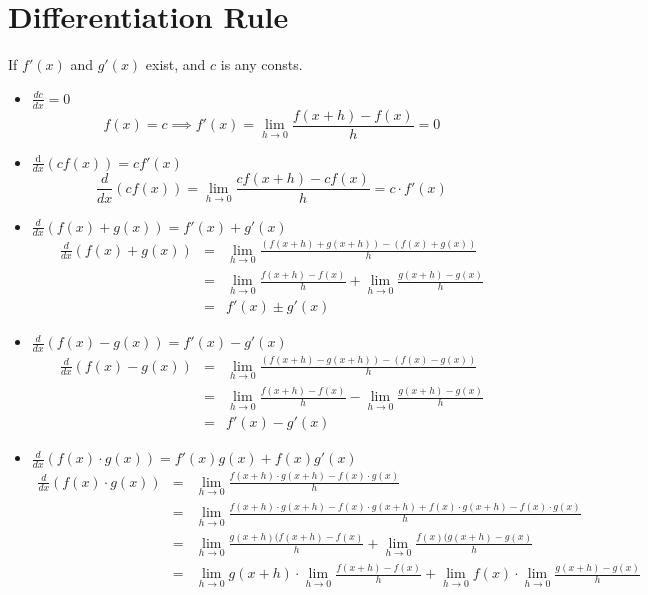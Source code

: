 \section{Differentiation Rule}
If $f'(x)$ and $g'(x)$ exist, and $c$ is any consts.
\begin{itemize}
\item $\displaystyle \frac{dc}{dx} = 0$
$$f(x) = c \displaystyle \implies f'(x) = \lim_{h \to 0} \frac{f(x+h) - f(x)}{h} = 0$$
\item $\displaystyle \frac{\mathrm{d}}{dx} (c f(x)) = c f'(x)$
$$\displaystyle \frac{d}{dx} (cf(x)) = \lim_{h \to 0} \frac{cf(x+h) - cf(x)}{h} = c \cdot f'(x)$$
\item $\displaystyle \frac{d}{dx} (f(x) + g(x)) = f'(x) + g'(x)$
$$\begin{array}{rcl}
\displaystyle \frac{d}{dx} (f(x) + g(x)) & = & \displaystyle \lim_{h \to 0} \frac{(f(x + h) + g(x+h)) - (f(x) + g(x))}{h}\\
& = & \displaystyle \lim_{h \to 0} \frac{f(x+h) - f(x)}{h} + \lim_{h \to 0} \frac{g(x+h) - g(x)}{h}\\
& = & f'(x) \pm g'(x)
\end{array}$$
\item $\displaystyle \frac{d}{dx} (f(x) - g(x)) = f'(x) - g'(x)$
$$\begin{array}{rcl}
\displaystyle \frac{d}{dx} (f(x) - g(x)) & = & \displaystyle \lim_{h \to 0} \frac{(f(x + h) - g(x+h)) - (f(x) - g(x))}{h}\\
& = & \displaystyle \lim_{h \to 0} \frac{f(x+h) - f(x)}{h} - \lim_{h \to 0} \frac{g(x+h) - g(x)}{h}\\
& = & f'(x) - g'(x)
\end{array}$$
\item $\displaystyle \frac{d}{dx} (f(x) \cdot g(x)) = f'(x)g(x) + f(x)g'(x)$ \quad {}
$$\begin{array}{rcl}
\displaystyle \frac{d}{dx} (f(x) \cdot g(x)) & = &\displaystyle \lim_{h \to 0} \frac{f(x+h) \cdot g(x+h) - f(x) \cdot g(x)}{h}\\
& = & \displaystyle \lim_{h \to 0} \frac{f(x+h) \cdot g(x+h) - f(x) \cdot g(x+h) + f(x) \cdot g(x+h) - f(x) \cdot g(x)}{h}\\
& = & \displaystyle \lim_{h \to 0} \frac{g(x+h)(f(x+h) -f(x)}{h} + \lim_{h \to 0} \frac{f(x) (g(x+h) -g(x)}{h}\\
& = & \displaystyle \lim_{h \to 0} g(x+h) \cdot \lim_{h \to 0} \frac{f(x+h) -f(x)}{h} + \lim_{h \to 0} f(x) \cdot \lim_{h \to 0} \frac{g(x+h) -g(x)}{h}\\

\end{array}$$
\end{itemize}
